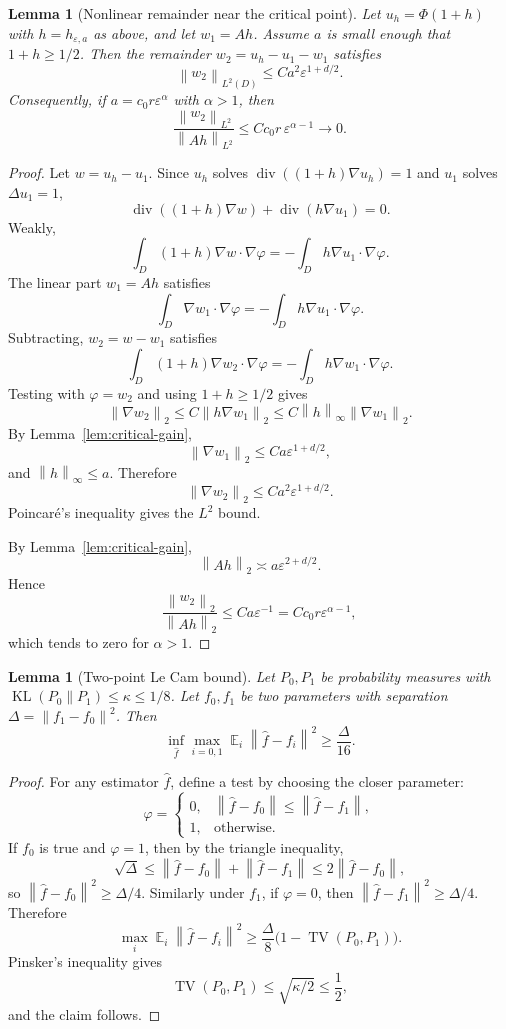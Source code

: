 \documentclass[12pt]{article}
\newtheorem{lemma}[theorem]{Lemma}
\theoremstyle{remark}
\DeclareMathOperator{\E}{\mathbb E}
\DeclareMathOperator{\divg}{div}
\DeclareMathOperator{\KL}{KL}
\DeclareMathOperator{\TV}{TV}
\newcommand{\norm}[1]{\left\lVert #1\right\rVert}
\newcommand{\asym}{\asymp}
\begin{document}
\begin{lemma}[Nonlinear remainder near the critical point]
\label{lem:critical-remainder}
Let \(u_h=\Phi(1+h)\) with \(h=h_{\varepsilon,a}\) as above, and let \(w_1=Ah\). Assume \(a\) is small enough that \(1+h\ge1/2\). Then the remainder \(w_2=u_h-u_1-w_1\) satisfies
\[
\norm{w_2}_{L^2(D)}
\le
C a^2\varepsilon^{1+d/2}.
\]
Consequently, if \(a=c_0r\varepsilon^\alpha\) with \(\alpha>1\), then
\[
\frac{\norm{w_2}_{L^2}}{\norm{Ah}_{L^2}}
\le
C c_0r\,\varepsilon^{\alpha-1}\to0.
\]
\end{lemma}
\begin{proof}
Let \(w=u_h-u_1\). Since \(u_h\) solves \(\divg((1+h)\nabla u_h)=1\) and \(u_1\) solves \(\Delta u_1=1\),
\[
\divg((1+h)\nabla w)+\divg(h\nabla u_1)=0.
\]
Weakly,
\[
\int_D(1+h)\nabla w\cdot\nabla\varphi
=
-\int_D h\nabla u_1\cdot\nabla\varphi.
\]
The linear part \(w_1=Ah\) satisfies
\[
\int_D\nabla w_1\cdot\nabla\varphi
=
-\int_D h\nabla u_1\cdot\nabla\varphi.
\]
Subtracting, \(w_2=w-w_1\) satisfies
\[
\int_D(1+h)\nabla w_2\cdot\nabla\varphi
=
-\int_D h\nabla w_1\cdot\nabla\varphi.
\]
Testing with \(\varphi=w_2\) and using \(1+h\ge1/2\) gives
\[
\norm{\nabla w_2}_2
\le
C\norm{h\nabla w_1}_2
\le
C\norm{h}_\infty\norm{\nabla w_1}_2.
\]
By Lemma~\ref{lem:critical-gain},
\[
\norm{\nabla w_1}_2
\le
C a\varepsilon^{1+d/2},
\]
and \(\norm{h}_\infty\le a\). Therefore
\[
\norm{\nabla w_2}_2
\le
C a^2\varepsilon^{1+d/2}.
\]
Poincar\'e's inequality gives the \(L^2\) bound.

By Lemma~\ref{lem:critical-gain},
\[
\norm{Ah}_2\asym a\varepsilon^{2+d/2}.
\]
Hence
\[
\frac{\norm{w_2}_2}{\norm{Ah}_2}
\le
C a\varepsilon^{-1}
=
C c_0r\varepsilon^{\alpha-1},
\]
which tends to zero for \(\alpha>1\).
\end{proof}

\begin{lemma}[Two-point Le Cam bound]
\label{lem:lecam}
Let \(P_0,P_1\) be probability measures with \(\KL(P_0\|P_1)\le\kappa\le1/8\). Let \(f_0,f_1\) be two parameters with separation \(\Delta=\norm{f_1-f_0}^2\). Then
\[
\inf_{\widehat f}\max_{i=0,1}\E_i\norm{\widehat f-f_i}^2
\ge
\frac{\Delta}{16}.
\]
\end{lemma}
\begin{proof}
For any estimator \(\widehat f\), define a test by choosing the closer parameter:
\[
\varphi=
\begin{cases}
0, & \norm{\widehat f-f_0}\le\norm{\widehat f-f_1},\\
1, & \text{otherwise}.
\end{cases}
\]
If \(f_0\) is true and \(\varphi=1\), then by the triangle inequality,
\[
\sqrt{\Delta}
\le
\norm{\widehat f-f_0}+\norm{\widehat f-f_1}
\le
2\norm{\widehat f-f_0},
\]
so \(\norm{\widehat f-f_0}^2\ge\Delta/4\). Similarly under \(f_1\), if \(\varphi=0\), then \(\norm{\widehat f-f_1}^2\ge\Delta/4\). Therefore
\[
\max_i\E_i\norm{\widehat f-f_i}^2
\ge
\frac{\Delta}{8}\bigl(1-\TV(P_0,P_1)\bigr).
\]
Pinsker's inequality \cite{Tsybakov} gives
\[
\TV(P_0,P_1)\le\sqrt{\kappa/2}\le\frac12,
\]
and the claim follows.
\end{proof}
\end{document}
